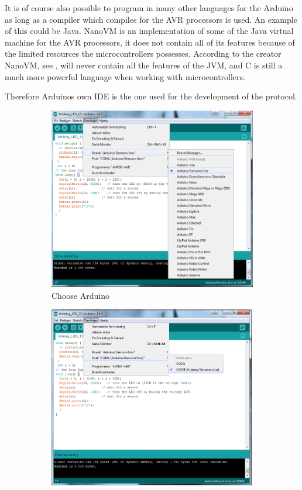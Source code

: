 It is of course also possible to program in many other languages for the Arduino as long as a compiler which compiles for the AVR processors is used.
An example of this could be Java.
NanoVM is an implementation of some of the Java virtual machine for the AVR processors, it does not contain all of its features because of the limited resources the microcontrollers possesses. 
According to the creator NanoVM, see \cite{NanoVM}, will never contain all the features of the JVM, and C is still a much more powerful language when working with microcontrollers. 

Therefore Arduinos own IDE is the one used for the development of the protocol.

\begin{figure}[!h]
	\begin{subfigure}{0.47\linewidth}
		\centering
		\includegraphics[width=\linewidth]{Figures/ChooseArduino.png}
		\caption{Choose Arduino}
		\label{fig:choose_arduino}
	\end{subfigure}\hfill
	\begin{subfigure}{0.47\linewidth}
		\centering
		\includegraphics[width=\linewidth]{Figures/ChoosePort.png}

\end{subfigure}
\end{figure}
